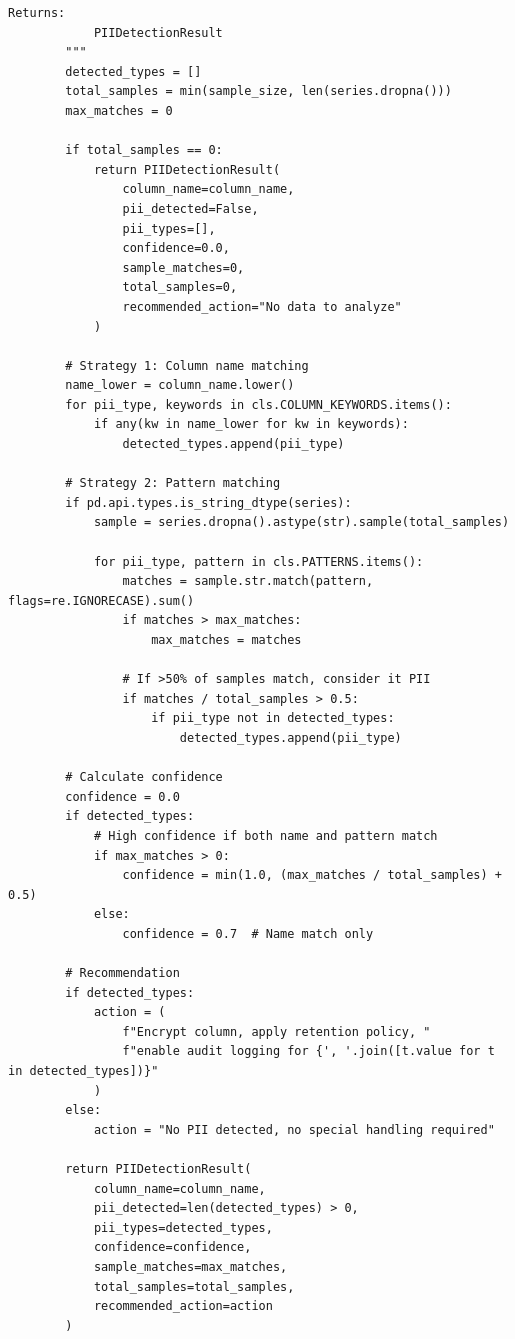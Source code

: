 \begin{lstlisting}[style=python, caption={Comprehensive data privacy compliance framework}]
        Returns:
            PIIDetectionResult
        """
        detected_types = []
        total_samples = min(sample_size, len(series.dropna()))
        max_matches = 0

        if total_samples == 0:
            return PIIDetectionResult(
                column_name=column_name,
                pii_detected=False,
                pii_types=[],
                confidence=0.0,
                sample_matches=0,
                total_samples=0,
                recommended_action="No data to analyze"
            )

        # Strategy 1: Column name matching
        name_lower = column_name.lower()
        for pii_type, keywords in cls.COLUMN_KEYWORDS.items():
            if any(kw in name_lower for kw in keywords):
                detected_types.append(pii_type)

        # Strategy 2: Pattern matching
        if pd.api.types.is_string_dtype(series):
            sample = series.dropna().astype(str).sample(total_samples)

            for pii_type, pattern in cls.PATTERNS.items():
                matches = sample.str.match(pattern, flags=re.IGNORECASE).sum()
                if matches > max_matches:
                    max_matches = matches

                # If >50% of samples match, consider it PII
                if matches / total_samples > 0.5:
                    if pii_type not in detected_types:
                        detected_types.append(pii_type)

        # Calculate confidence
        confidence = 0.0
        if detected_types:
            # High confidence if both name and pattern match
            if max_matches > 0:
                confidence = min(1.0, (max_matches / total_samples) + 0.5)
            else:
                confidence = 0.7  # Name match only

        # Recommendation
        if detected_types:
            action = (
                f"Encrypt column, apply retention policy, "
                f"enable audit logging for {', '.join([t.value for t in detected_types])}"
            )
        else:
            action = "No PII detected, no special handling required"

        return PIIDetectionResult(
            column_name=column_name,
            pii_detected=len(detected_types) > 0,
            pii_types=detected_types,
            confidence=confidence,
            sample_matches=max_matches,
            total_samples=total_samples,
            recommended_action=action
        )


\end{lstlisting}
